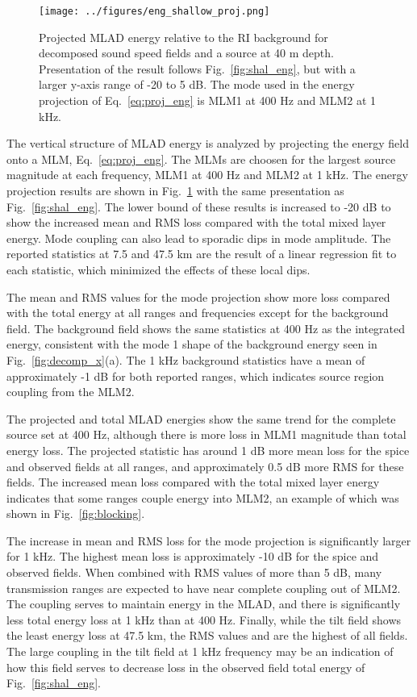 \documentclass[preprint,NumberedRefs]{JASA}
\begin{document}
\begin{figure}
\texttt{[image: ../figures/eng\_shallow\_proj.png]}
    \caption{Projected MLAD energy relative to the RI background for decomposed sound speed fields and a source at 40 m depth. Presentation of the result follows Fig.~\ref{fig:shal_eng}, but with a larger y-axis range of -20 to 5 dB. The mode used in the energy projection of Eq.~\eqref{eq:proj_eng} is MLM1 at 400 Hz and MLM2 at 1 kHz.}
    \label{fig:shal_proj}
\end{figure}
The vertical structure of MLAD energy is analyzed by projecting the energy field onto a MLM, Eq.~\eqref{eq:proj_eng}. The MLMs are choosen for the largest source magnitude at each frequency, MLM1 at 400 Hz and MLM2 at 1 kHz. The energy projection results are shown in Fig.~\ref{fig:shal_proj} with the same presentation as Fig.~\ref{fig:shal_eng}. The lower bound of these results is increased to -20 dB to show the increased mean and RMS loss compared with the total mixed layer energy. Mode coupling can also lead to sporadic dips in mode amplitude. The reported statistics at 7.5 and 47.5 km are the result of a linear regression fit to each statistic, which minimized the effects of these local dips.

The mean and RMS values for the mode projection show more loss compared with the total energy at all ranges and frequencies except for the background field. The background field shows the same statistics at 400 Hz as the integrated energy, consistent with the mode 1 shape of the background energy seen in Fig.~\ref{fig:decomp_x}(a). The 1 kHz background statistics have a mean of approximately -1 dB for both reported ranges, which indicates source region coupling from the MLM2.

The projected and total MLAD energies show the same trend for the complete source set at 400 Hz, although there is more loss in MLM1 magnitude than total energy loss. The projected statistic has around 1 dB more mean loss for the spice and observed fields at all ranges, and approximately 0.5 dB more RMS for these fields. The increased mean loss compared with the total mixed layer energy indicates that some ranges couple energy into MLM2, an example of which was shown in Fig.~\ref{fig:blocking}.

The increase in mean and RMS loss for the mode projection is significantly larger for 1 kHz. The highest mean loss is approximately -10 dB for the spice and observed fields. When combined with RMS values of more than 5 dB, many transmission ranges are expected to have near complete coupling out of MLM2. The coupling serves to maintain energy in the MLAD, and there is significantly less total energy loss at 1 kHz than at 400 Hz. Finally, while the tilt field shows the least energy loss at 47.5 km, the RMS values and are the highest of all fields. The large coupling in the tilt field at 1 kHz frequency may be an indication of how this field serves to decrease loss in the observed field total energy of Fig.~\ref{fig:shal_eng}.
\end{document}
